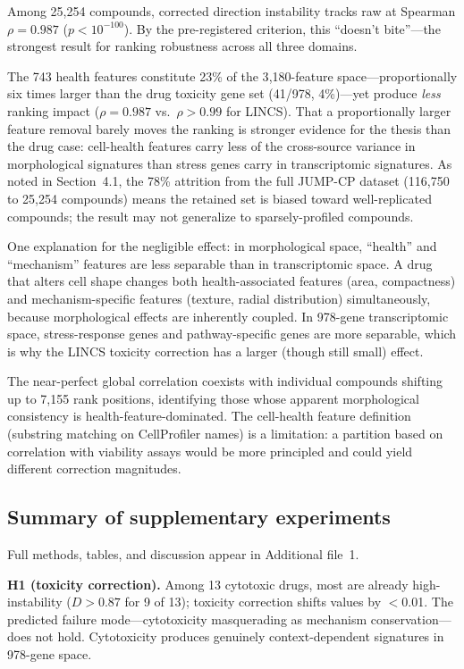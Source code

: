 \documentclass[11pt]{article}
\begin{document}
Among 25{,}254 compounds, corrected direction instability tracks raw
at Spearman $\rho = 0.987$ ($p < 10^{-100}$). By the pre-registered
criterion, this ``doesn't bite''---the strongest result for ranking
robustness across all three domains.

The 743 health features constitute 23\% of the 3{,}180-feature
space---proportionally six times larger than the drug toxicity gene set
(41/978, 4\%)---yet produce \emph{less} ranking impact ($\rho = 0.987$
vs.\ $\rho > 0.99$ for LINCS). That a proportionally larger feature
removal barely moves the ranking is stronger evidence for the thesis than
the drug case: cell-health features carry less of the cross-source
variance in morphological signatures than stress genes carry in
transcriptomic signatures. As noted in Section~4.1, the 78\% attrition
from the full JUMP-CP dataset (116{,}750 to 25{,}254 compounds) means
the retained set is biased toward well-replicated compounds; the result
may not generalize to sparsely-profiled compounds.

One explanation for the negligible effect: in morphological space,
``health'' and ``mechanism'' features are less separable than in
transcriptomic space. A drug that alters cell shape changes both
health-associated features (area, compactness) and mechanism-specific
features (texture, radial distribution) simultaneously, because
morphological effects are inherently coupled. In 978-gene transcriptomic
space, stress-response genes and pathway-specific genes are more
separable, which is why the LINCS toxicity correction has a larger
(though still small) effect.

The near-perfect global correlation coexists with individual compounds
shifting up to 7{,}155 rank positions, identifying those whose apparent
morphological consistency is health-feature-dominated. The cell-health feature
definition (substring matching on CellProfiler names) is a limitation:
a partition based on correlation with viability assays would be more
principled and could yield different correction magnitudes.

\subsection{Summary of supplementary experiments}

Full methods, tables, and discussion appear in Additional file~1.

\textbf{H1 (toxicity correction).} Among 13 cytotoxic drugs, most are already high-instability ($D > 0.87$
for 9 of 13); toxicity correction shifts values by $<$0.01. The predicted
failure mode---cytotoxicity masquerading as mechanism conservation---does
not hold. Cytotoxicity produces genuinely context-dependent signatures in
978-gene space.
\end{document}

